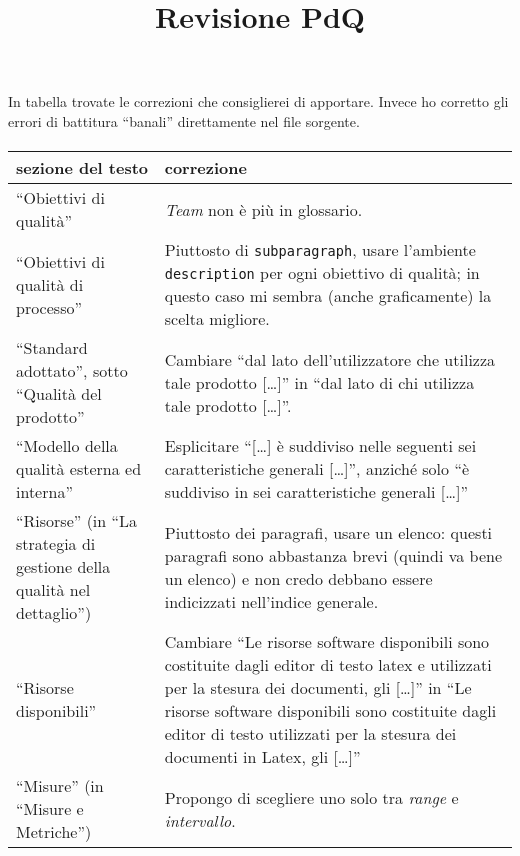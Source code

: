 \documentclass[a4paper]{article}
\title{Revisione PdQ}
\author{\GG}
\begin{document}
\maketitle

\paragraph{}
In tabella trovate le correzioni che consiglierei di apportare. Invece ho corretto gli errori di battitura “banali” direttamente nel file sorgente.

\paragraph{}
\begin{longtable}{| p{3cm} | p{10cm} |}
	\hline
	\textbf{sezione del testo} & \textbf{correzione} \\ \hline
	\hline
	“Obiettivi di qualità” & \emph{Team} non è più in glossario. \\ \hline
	“Obiettivi di qualità di processo” & Piuttosto di \texttt{subparagraph}, usare l'ambiente \texttt{description} per ogni obiettivo di qualità; in questo caso mi sembra (anche graficamente) la scelta migliore. \\ \hline
	“Standard adottato”, sotto “Qualità del prodotto” & Cambiare “dal lato dell’utilizzatore che utilizza tale prodotto [\dots]” in “dal lato di chi utilizza tale prodotto [\dots]”. \\ \hline
	“Modello della qualità esterna ed interna” & Esplicitare “[\dots] è suddiviso nelle seguenti sei caratteristiche generali [\dots]”, anziché solo “è suddiviso in sei caratteristiche generali [\dots]” \\ \hline
	“Risorse” (in “La strategia di gestione della qualità nel dettaglio”) & Piuttosto dei paragrafi, usare un elenco: questi paragrafi sono abbastanza brevi (quindi va bene un elenco) e non credo debbano essere indicizzati nell'indice generale. \\ \hline
	“Risorse disponibili” & Cambiare “Le risorse software disponibili sono costituite dagli editor di testo latex e utilizzati per la stesura dei documenti, gli \gloss{IDE} [\dots]” in “Le risorse software disponibili sono costituite dagli editor di testo utilizzati per la stesura dei documenti in Latex, gli \gloss{IDE} [\dots]” \\ \hline
	“Misure” (in “Misure e Metriche”) & Propongo di scegliere uno solo tra \emph{range} e \emph{intervallo}. \\ \hline

\end{longtable}
\end{document}
